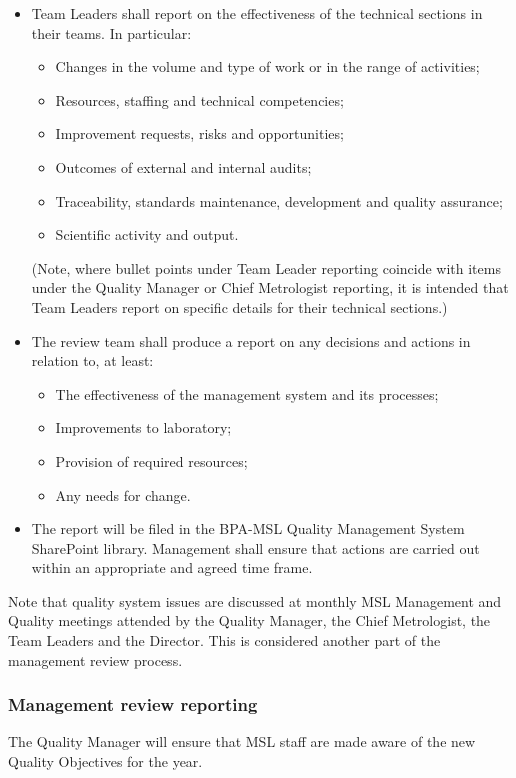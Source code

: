 \begin{itemize}
\item Team Leaders shall report on the effectiveness of the technical sections in their teams. In particular: 
\begin{itemize}
\item Changes in the volume and type of work or in the range of activities;
\item Resources, staffing and technical competencies;
\item Improvement requests, risks and opportunities;
\item Outcomes of external and internal audits;
\item Traceability, standards maintenance, development and quality assurance;
\item Scientific activity and output.
\end{itemize}
(Note, where bullet points under Team Leader reporting coincide with items under the Quality Manager or Chief Metrologist reporting, it is intended that Team Leaders report on specific details for their technical sections.) 
\item The review team shall produce a report on any decisions and actions in relation to, at least:
\begin{itemize}
\item The effectiveness of the management system and its processes;
\item Improvements to laboratory;
\item Provision of required resources;
\item Any needs for change.
\end{itemize}
\item The report will be filed in the BPA-MSL Quality Management System SharePoint library. Management shall ensure that actions are carried out within an appropriate and agreed time frame.
\end{itemize}

Note that quality system issues are discussed at monthly MSL Management and Quality meetings attended by the Quality Manager, the Chief Metrologist, the Team Leaders and the Director. This is considered another part of the management review process.
\subsubsection{Management review reporting}
The Quality Manager will ensure that MSL staff are made aware of the new Quality Objectives for the year.